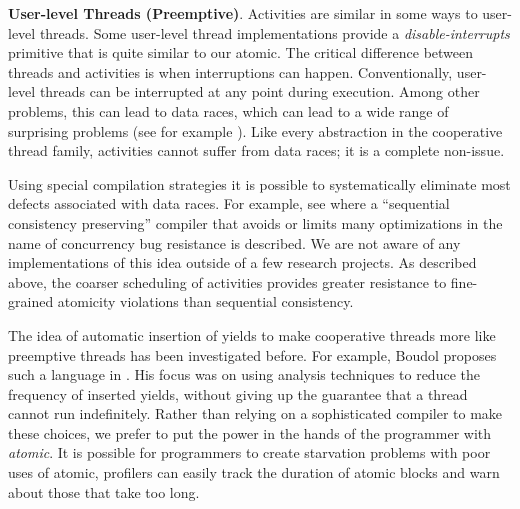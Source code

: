 \documentclass[9pt,preprint]{sigplanconf}
\begin{document}

\textbf{User-level Threads (Preemptive)}.
Activities are similar in some ways to user-level threads.
Some user-level thread implementations provide a \emph{disable-interrupts} primitive that is quite similar to our atomic.
The critical difference between threads and activities is when interruptions can happen.
Conventionally, user-level threads can be interrupted at any point during execution.
Among other problems, this can lead to data races, which can lead to a wide range of surprising problems (see for example \cite{Boehm2011}).
Like every abstraction in the cooperative thread family, activities cannot suffer from data races; it is a complete non-issue.

Using special compilation strategies it is possible to systematically eliminate most defects associated with data races.
For example, see \cite{Singh2012} where a ``sequential consistency preserving'' compiler that avoids or limits many optimizations in the name of concurrency bug resistance is described.
We are not aware of any implementations of this idea outside of a few research projects.
As described above, the coarser scheduling of activities provides greater resistance to fine-grained atomicity violations than sequential consistency.

The idea of automatic insertion of yields to make cooperative threads more like preemptive threads has been investigated before.
For example, Boudol proposes such a language in \cite{Boudol2007}.
His focus was on using analysis techniques to reduce the frequency of inserted yields, without giving up the guarantee that a thread cannot run indefinitely.
Rather than relying on a sophisticated compiler to make these choices, we prefer to put the power in the hands of the programmer with \emph{atomic}.
It is possible for programmers to create starvation problems with poor uses of atomic, profilers can easily track the duration of atomic blocks and warn about those that take too long.
\end{document}
